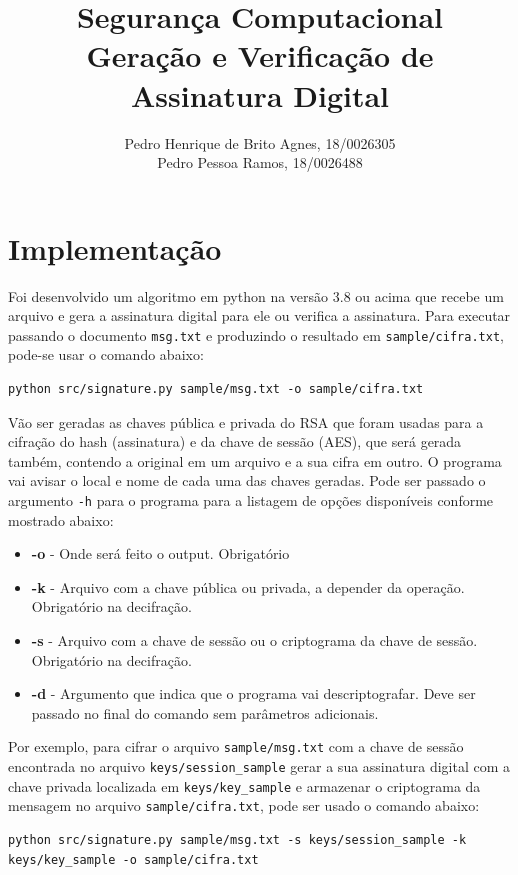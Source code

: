 \documentclass[12pt]{article}
\title{\textbf{Segurança Computacional\\ \Large{Geração e Verificação de Assinatura Digital}}}
\author{Pedro Henrique de Brito Agnes, 18/0026305
\\ Pedro Pessoa Ramos, 18/0026488
}
\affil{Dep. Ciência da Computação - Universidade de Brasília (UnB) \vspace{-2ex}}
\date{}
\begin{document}
\maketitle

\section{Implementação}

Foi desenvolvido um algoritmo em python na versão 3.8 ou acima que recebe um arquivo e gera a assinatura digital para ele ou verifica a assinatura. Para executar passando o documento \texttt{msg.txt} e produzindo o resultado em \texttt{sample/cifra.txt}, pode-se usar o comando abaixo:

\begin{lstlisting}
python src/signature.py sample/msg.txt -o sample/cifra.txt
\end{lstlisting}

Vão ser geradas as chaves pública e privada do RSA que foram usadas para a cifração do hash (assinatura) e da chave de sessão (AES), que será gerada também, contendo a original em um arquivo e a sua cifra em outro. O programa vai avisar o local e nome de cada uma das chaves geradas. Pode ser passado o argumento \texttt{-h} para o programa para a listagem de opções disponíveis conforme mostrado abaixo:

\begin{itemize}
    \item \textbf{-o} - Onde será feito o output. Obrigatório
    \item \textbf{-k} - Arquivo com a chave pública ou privada, a depender da operação. Obrigatório na decifração.
    \item \textbf{-s} - Arquivo com a chave de sessão ou o criptograma da chave de sessão. Obrigatório na decifração.
    \item \textbf{-d} - Argumento que indica que o programa vai descriptografar. Deve ser passado no final do comando sem parâmetros adicionais.
\end{itemize}

Por exemplo, para cifrar o arquivo \texttt{sample/msg.txt} com a chave de sessão encontrada no arquivo \texttt{keys/session\_sample} gerar a sua assinatura digital com a chave privada localizada em \texttt{keys/key\_sample} e armazenar o criptograma da mensagem no arquivo \texttt{sample/cifra.txt}, pode ser usado o comando abaixo:

\begin{lstlisting}
python src/signature.py sample/msg.txt -s keys/session_sample -k keys/key_sample -o sample/cifra.txt
\end{lstlisting}
\end{document}
